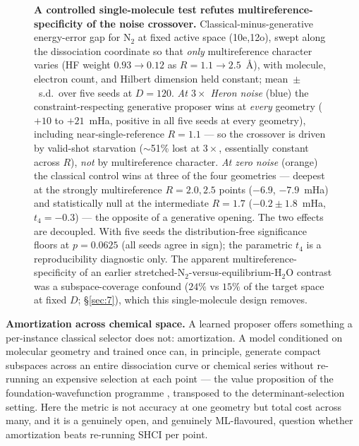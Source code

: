 \documentclass[11pt]{article}
\begin{document}
\begin{figure}[tb]
\caption{\textbf{A controlled single-molecule test refutes multireference-specificity of the noise crossover.} Classical-minus-generative energy-error gap for N$_2$ at fixed active space (10e,12o), swept along the dissociation coordinate so that \emph{only} multireference character varies (HF weight $0.93\to0.12$ as $R{=}1.1\to2.5$~\AA), with molecule, electron count, and Hilbert dimension held constant; mean~$\pm$~s.d.\ over five seeds at $D{=}120$. \emph{At $3\times$ Heron noise} (blue) the constraint-respecting generative proposer wins at \emph{every} geometry ($+10$ to $+21$~mHa, positive in all five seeds at every geometry), including near-single-reference $R{=}1.1$ --- so the crossover is driven by valid-shot starvation ($\sim$51\% lost at $3\times$, essentially constant across $R$), \emph{not} by multireference character. \emph{At zero noise} (orange) the classical control wins at three of the four geometries --- deepest at the strongly multireference $R{=}2.0,2.5$ points ($-6.9$, $-7.9$~mHa) and statistically null at the intermediate $R{=}1.7$ ($-0.2\pm1.8$~mHa, $t_4{=}-0.3$) --- the opposite of a generative opening. The two effects are decoupled. With five seeds the distribution-free significance floors at $p{=}0.0625$ (all seeds agree in sign); the parametric $t_4$ is a reproducibility diagnostic only. The apparent multireference-specificity of an earlier stretched-N$_2$-versus-equilibrium-H$_2$O contrast was a subspace-coverage confound ($24\%$ vs $15\%$ of the target space at fixed $D$; \S\ref{sec:7}), which this single-molecule design removes.}
\label{fig:crossover}
\end{figure}

\textbf{Amortization across chemical space.} A learned proposer offers something a per-instance classical selector does not: amortization. A model conditioned on molecular geometry and trained once can, in principle, generate compact subspaces across an entire dissociation curve or chemical series without re-running an expensive selection at each point --- the value proposition of the foundation-wavefunction programme \cite{foster2025}, transposed to the determinant-selection setting. Here the metric is not accuracy at one geometry but total cost across many, and it is a genuinely open, and genuinely ML-flavoured, question whether amortization beats re-running SHCI per point.
\end{document}
